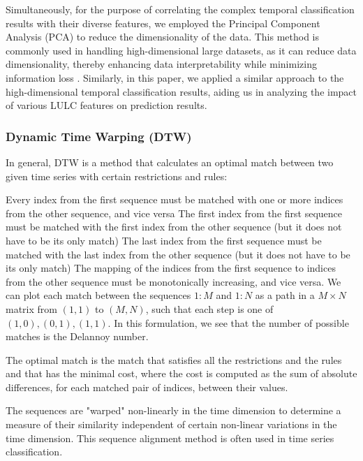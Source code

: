 \documentclass[a4paper,fleqn]{cas-sc}
\begin{document}
Simultaneously, for the purpose of correlating the complex temporal classification results with their diverse features, we employed the 
Principal Component Analysis (PCA) \citep{mackiewicz1993principal} to reduce the dimensionality of the data. This method is commonly used in handling high-dimensional large datasets, as it can reduce data dimensionality, thereby enhancing data interpretability while minimizing information loss \citep{jolliffe2016principal}. Similarly, in this paper, we applied a similar approach to the high-dimensional temporal classification results, aiding us in analyzing the impact of various LULC features on prediction results.
\subsubsection{Dynamic Time Warping (DTW)}\label{DTW}
In general, DTW is a method that calculates an optimal match between two given time series with certain restrictions and rules:

Every index from the first sequence must be matched with one or more indices from the other sequence, and vice versa
The first index from the first sequence must be matched with the first index from the other sequence (but it does not have to be its only match)
The last index from the first sequence must be matched with the last index from the other sequence (but it does not have to be its only match)
The mapping of the indices from the first sequence to indices from the other sequence must be monotonically increasing, and vice versa. We can plot each match between the sequences $1:M$ and $1:N$ as a path in a $M\times N$ matrix from $(1,1)$ to $(M, N)$, such that each step is one of $(1,0),(0,1),(1,1)$. In this formulation, we see that the number of possible matches is the Delannoy number.

The optimal match is the match that satisfies all the restrictions and the rules and that has the minimal cost, where the cost is computed as the sum of absolute differences, for each matched pair of indices, between their values.

The sequences are "warped" non-linearly in the time dimension to determine a measure of their similarity independent of certain non-linear variations in the time dimension. This sequence alignment method is often used in time series classification. 
\end{document}

